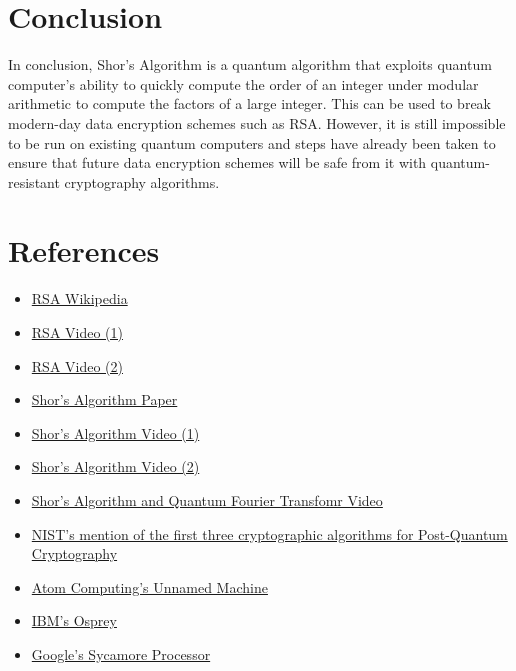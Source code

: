 \documentclass{article}
\begin{document}
\section{Conclusion}

In conclusion, Shor's Algorithm is a quantum algorithm that exploits quantum computer's ability to quickly compute the order of an integer under modular arithmetic to compute the factors of a large integer. This can be used to break modern-day data encryption schemes such as RSA. However, it is still impossible to be run on existing quantum computers and steps have already been taken to ensure that future data encryption schemes will be safe from it with quantum-resistant cryptography algorithms.

\newpage

\section{References}

\begin{itemize}
    \item \href{https://en.wikipedia.org/wiki/RSA_(cryptosystem)}{RSA Wikipedia}
    \item \href{https://www.youtube.com/watch?v=4zahvcJ9glg}{RSA Video (1)}
    \item \href{https://www.youtube.com/watch?v=JD72Ry60eP4}{RSA Video (2)}
    \item \href{https://arxiv.org/abs/quant-ph/9508027}{Shor's Algorithm Paper}
    \item \href{https://www.youtube.com/watch?v=lvTqbM5Dq4Q}{Shor's Algorithm Video (1)}
    \item \href{https://www.youtube.com/watch?v=zoKIWrpan6M}{Shor's Algorithm Video (2)}
    \item \href{https://www.youtube.com/watch?v=ukqduQEP8_o}{Shor's Algorithm and Quantum Fourier Transfomr Video}
    \item \href{https://csrc.nist.gov/news/2023/three-draft-fips-for-post-quantum-cryptography}{NIST's mention of the first three cryptographic algorithms for Post-Quantum Cryptography}
    \item \href{https://www.forbes.com/sites/moorinsights/2023/10/24/atom-computing-announces-record-breaking-1225-qubit-quantum-computer/?sh=b0e7808491a2}{Atom Computing's Unnamed Machine}
    \item \href{https://newatlas.com/computers/ibm-osprey-worlds-most-powerful-quantum-computer/}{IBM's Osprey}
    \item \href{https://en.wikipedia.org/wiki/Sycamore_processor}{Google's Sycamore Processor}
\end{itemize}
\end{document}
